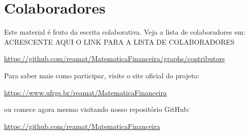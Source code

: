 \chapter*{Colaboradores}\label{colaboradores}
\iflatexml\else{}\fi

Este material é fruto da escrita colaborativa. Veja a lista de colaboradores em: 
ACRESCENTE AQUI O LINK PARA A LISTA DE COLABORADORES 

\begin{center} 
  \url{https://github.com/reamat/MatematicaFinanceira/graphs/contributors}
\end{center}

Para saber mais como participar, visite o site oficial do projeto:
\begin{center}
  \url{https://www.ufrgs.br/reamat/MatematicaFinanceira}
\end{center}
ou comece agora mesmo visitando nosso repositório GitHub:
\begin{center}
  \url{https://github.com/reamat/MatematicaFinanceira}
\end{center}